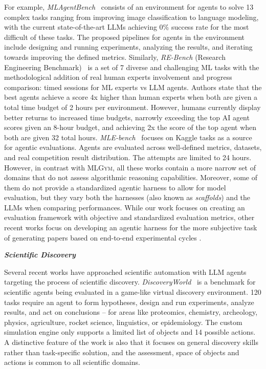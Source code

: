 \documentclass[]{fairmeta}
\newcommand{\ibold}[1]{\textbf{\textit{#1}}}
\newcommand{\mlgym}{\fontfamily{lmr}\selectfont\mdseries\textsc{MLGym}\xspace}
\begin{document}
For example, \textit{MLAgentBench}~\citep{huangMLAgentBenchEvaluatingLanguage2024} consists of an environment for agents to solve 13 complex tasks ranging from improving image classification to language modeling, with the current state-of-the-art LLMs achieving 0\% success rate for the most difficult of these tasks. The proposed pipelines for agents in the environment include designing and running experiments, analyzing the results, and iterating towards improving the defined metrics. Similarly, \textit{RE-Bench} (Research Engineering Benchmark)~\citep{rebench-metr} is a set of 7 diverse and challenging ML tasks with the methodological addition of real human experts involvement and progress comparison: timed sessions for ML experts vs LLM agents. Authors state that the best agents achieve a score 4x higher than human experts when both are given a total time budget of 2 hours per environment. However, humans currently display better returns to increased time budgets, narrowly exceeding the top AI agent scores given an 8-hour budget, and achieving 2x the score of the top agent when both are given 32 total hours. \textit{MLE-bench}~\citep{chanMLEbenchEvaluatingMachine2024} focuses on Kaggle tasks as a source for agentic evaluations. Agents are evaluated across well-defined metrics, datasets, and real competition result distribution. The attempts are limited to 24 hours. However, in contrast with \textsc{\mlgym}, all these works contain a more narrow set of domains that do not assess algorithmic reasoning capabilities. Moreover, some of them do not provide a standardized agentic harness to allow for model evaluation, but they vary both the harnesses (also known as \textit{scaffolds}) and the LLMs when comparing performances. While our work focuses on creating an evaluation framework with objective and standardized evaluation metrics, other recent works focus on developing an agentic harness for the more subjective task of generating papers based on end-to-end experimental cycles \citep{luAIScientistFully2024}. 


\ibold{Scientific Discovery}

Several recent works have approached scientific automation with LLM agents targeting the process of scientific discovery. \textit{DiscoveryWorld}~\citep{jansenDISCOVERYWORLDVirtualEnvironment2024} is a benchmark for scientific agents being evaluated in a game-like virtual discovery environment. 120 tasks require an agent to form hypotheses, design and run experiments, analyze results, and act on conclusions -- for areas like proteomics, chemistry, archeology, physics, agriculture, rocket science, linguistics, or epidemiology. The custom simulation engine only supports a limited list of objects and 14 possible actions.
A distinctive feature of the work is also that it focuses on general discovery skills rather than task-specific solution, and the assessment, space of objects and actions is common to all scientific domains.
\end{document}
